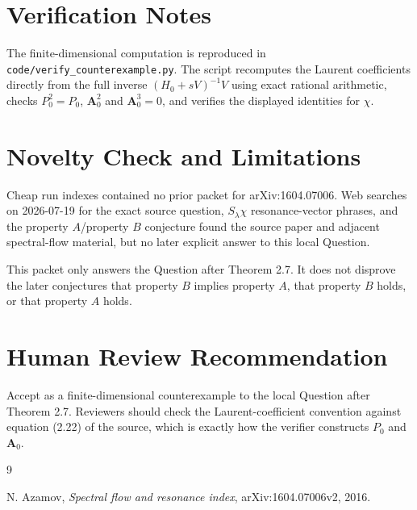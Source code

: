 \documentclass[11pt]{article}
\newcommand{\Aop}{\mathbf A_0}
\begin{document}
\section*{Verification Notes}

The finite-dimensional computation is reproduced in
\texttt{code/verify\_counterexample.py}. The script recomputes the Laurent
coefficients directly from the full inverse \((H_0+sV)^{-1}V\) using exact
rational arithmetic, checks \(P_0^2=P_0\), \(\Aop^2\) and \(\Aop^3=0\), and
verifies the displayed identities for \(\chi\).

\section*{Novelty Check and Limitations}

Cheap run indexes contained no prior packet for arXiv:1604.07006. Web searches
on 2026-07-19 for the exact source question, \(S_\lambda\chi\) resonance-vector
phrases, and the property \(A\)/property \(B\) conjecture found the source
paper and adjacent spectral-flow material, but no later explicit answer to this
local Question.

This packet only answers the Question after Theorem 2.7. It does not disprove
the later conjectures that property \(B\) implies property \(A\), that property
\(B\) holds, or that property \(A\) holds.

\section*{Human Review Recommendation}

Accept as a finite-dimensional counterexample to the local Question after
Theorem 2.7. Reviewers should check the Laurent-coefficient convention against
equation (2.22) of the source, which is exactly how the verifier constructs
\(P_0\) and \(\Aop\).

\begin{thebibliography}{9}

N. Azamov,
\emph{Spectral flow and resonance index},
arXiv:1604.07006v2, 2016.

\end{thebibliography}
\end{document}
